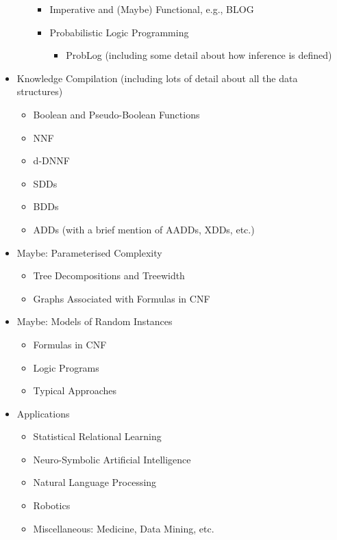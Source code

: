 \begin{itemize}
\begin{itemize}
\begin{itemize}
    \item Imperative and (Maybe) Functional, e.g., BLOG
    \item Probabilistic Logic Programming
      \begin{itemize}
      \item ProbLog (including some detail about how inference is defined)
      \end{itemize}
    \end{itemize}
  \end{itemize}
\item Knowledge Compilation (including lots of detail about all the data structures)
  \begin{itemize}
  \item Boolean and Pseudo-Boolean Functions
  \item NNF
  \item d-DNNF
  \item SDDs
  \item BDDs
  \item ADDs (with a brief mention of AADDs, XDDs, etc.)
  \end{itemize}
\item Maybe: Parameterised Complexity
  \begin{itemize}
  \item Tree Decompositions and Treewidth
  \item Graphs Associated with Formulas in CNF
  \end{itemize}
\item Maybe: Models of Random Instances
  \begin{itemize}
  \item Formulas in CNF
  \item Logic Programs
  \item Typical Approaches
  \end{itemize}
\item Applications
  \begin{itemize}
  \item Statistical Relational Learning
  \item Neuro-Symbolic Artificial Intelligence
  \item Natural Language Processing
  \item Robotics
  \item Miscellaneous: Medicine, Data Mining, etc.
  \end{itemize}
\end{itemize}

